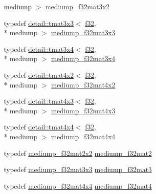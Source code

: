 \begin{DoxyCompactItemize}
mediump $>$ \hyperlink{group__gtc__type__precision_ga9762d48bb9b41e3cf40f6e616cf61b6b}{mediump\-\_\-f32mat3x2}
\item 
typedef \hyperlink{structglm_1_1detail_1_1tmat3x3}{detail\-::tmat3x3}$<$ \hyperlink{group__gtc__type__precision_ga0ec999b57f5330d9021256e96038df04}{f32}, \\*
mediump $>$ \hyperlink{group__gtc__type__precision_gad4d01189a1462366b143c5cbc3de0ea9}{mediump\-\_\-f32mat3x3}
\item 
typedef \hyperlink{structglm_1_1detail_1_1tmat3x4}{detail\-::tmat3x4}$<$ \hyperlink{group__gtc__type__precision_ga0ec999b57f5330d9021256e96038df04}{f32}, \\*
mediump $>$ \hyperlink{group__gtc__type__precision_ga7ad59b967576d930f4c8aa7b8c48e1af}{mediump\-\_\-f32mat3x4}
\item 
typedef \hyperlink{structglm_1_1detail_1_1tmat4x2}{detail\-::tmat4x2}$<$ \hyperlink{group__gtc__type__precision_ga0ec999b57f5330d9021256e96038df04}{f32}, \\*
mediump $>$ \hyperlink{group__gtc__type__precision_ga3400d5463f0a58cf3959406aa2b69f72}{mediump\-\_\-f32mat4x2}
\item 
typedef \hyperlink{structglm_1_1detail_1_1tmat4x3}{detail\-::tmat4x3}$<$ \hyperlink{group__gtc__type__precision_ga0ec999b57f5330d9021256e96038df04}{f32}, \\*
mediump $>$ \hyperlink{group__gtc__type__precision_ga31635d753ab8a19fdaa80d2b89e90c54}{mediump\-\_\-f32mat4x3}
\item 
typedef \hyperlink{structglm_1_1detail_1_1tmat4x4}{detail\-::tmat4x4}$<$ \hyperlink{group__gtc__type__precision_ga0ec999b57f5330d9021256e96038df04}{f32}, \\*
mediump $>$ \hyperlink{group__gtc__type__precision_ga8f83086fffe71f9cd15e75a1de101ba6}{mediump\-\_\-f32mat4x4}
\item 
typedef \hyperlink{group__gtc__type__precision_ga23c9239d6aa9b41c3d2145e2faa81edb}{mediump\-\_\-f32mat2x2} \hyperlink{group__gtc__type__precision_ga103735a38477f7c389b36aae0fbdf274}{mediump\-\_\-f32mat2}
\item 
typedef \hyperlink{group__gtc__type__precision_gad4d01189a1462366b143c5cbc3de0ea9}{mediump\-\_\-f32mat3x3} \hyperlink{group__gtc__type__precision_gae263a08ef179894fdd36f9a51698c4ab}{mediump\-\_\-f32mat3}
\item 
typedef \hyperlink{group__gtc__type__precision_ga8f83086fffe71f9cd15e75a1de101ba6}{mediump\-\_\-f32mat4x4} \hyperlink{group__gtc__type__precision_ga56bd98ec31b6abc0315d688d4ecd94a0}{mediump\-\_\-f32mat4}

\end{DoxyCompactItemize}
